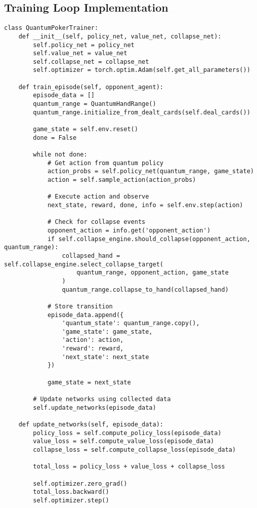 \documentclass[11pt,a4paper]{article}
\begin{document}
\subsection{Training Loop Implementation}

\begin{lstlisting}
class QuantumPokerTrainer:
    def __init__(self, policy_net, value_net, collapse_net):
        self.policy_net = policy_net
        self.value_net = value_net
        self.collapse_net = collapse_net
        self.optimizer = torch.optim.Adam(self.get_all_parameters())
        
    def train_episode(self, opponent_agent):
        episode_data = []
        quantum_range = QuantumHandRange()
        quantum_range.initialize_from_dealt_cards(self.deal_cards())
        
        game_state = self.env.reset()
        done = False
        
        while not done:
            # Get action from quantum policy
            action_probs = self.policy_net(quantum_range, game_state)
            action = self.sample_action(action_probs)
            
            # Execute action and observe
            next_state, reward, done, info = self.env.step(action)
            
            # Check for collapse events
            opponent_action = info.get('opponent_action')
            if self.collapse_engine.should_collapse(opponent_action, quantum_range):
                collapsed_hand = self.collapse_engine.select_collapse_target(
                    quantum_range, opponent_action, game_state
                )
                quantum_range.collapse_to_hand(collapsed_hand)
                
            # Store transition
            episode_data.append({
                'quantum_state': quantum_range.copy(),
                'game_state': game_state,
                'action': action,
                'reward': reward,
                'next_state': next_state
            })
            
            game_state = next_state
            
        # Update networks using collected data
        self.update_networks(episode_data)
        
    def update_networks(self, episode_data):
        policy_loss = self.compute_policy_loss(episode_data)
        value_loss = self.compute_value_loss(episode_data)
        collapse_loss = self.compute_collapse_loss(episode_data)
        
        total_loss = policy_loss + value_loss + collapse_loss
        
        self.optimizer.zero_grad()
        total_loss.backward()
        self.optimizer.step()
\end{lstlisting}
\end{document}

